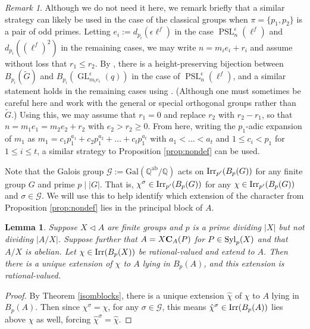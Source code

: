 \documentclass[12pt,leqno,a4paper]{amsart}
\newcommand{\Q}{{\mathbb{Q}}}
\newcommand{\PSL}{{\operatorname{PSL}}}
\def\syl#1#2{{\rm Syl}_#1(#2)}
\def\irr#1{{\rm Irr}(#1)}
\def\cent#1#2{{\bf C}_{#1}(#2)}
\def\irrp#1#2{{\rm Irr}_{#1'}(#2)}
\newtheorem{lem}[thm]{Lemma}
\theoremstyle{remark}
\newtheorem{rem}[thm]{Remark}
\newcommand\wt[1]{\widetilde{#1}}
\newcommand{\GL}{\operatorname{GL}}
\newcommand{\gal}{\mathcal{G}}
\begin{document}
\begin{rem}\label{rem:oddp1}
Although we do not need it here, we remark briefly that a similar strategy can likely be used in the case of the classical groups when $\pi=\{p_1,p_2\}$ is a pair of odd primes.  Letting $e_i:=d_{p_i}(\epsilon\ell^f)$ in the case $\PSL_n^\epsilon(\ell^f)$ and $d_{p_i}((\ell^f)^2)$ in the remaining cases, we may write $n=m_ie_i+r_i$ and assume without loss that $r_1\leq r_2$.
  By \cite[Theorem 1.9]{MO83}, there is a height-preserving bijection between $B_{p_i}(\wt{G})$ and $B_{p_i}(\GL^\epsilon_{m_ie_i}(q))$ in the case of $\PSL_n^\epsilon(\ell^f)$, and a similar statement holds in the remaining cases using \cite[Theorem 5.17]{malle19}. (Although one must sometimes be careful here and work with the general or special orthogonal groups rather than $\wt{G}$.) 
  Using this, we may assume that $r_1=0$ and replace $r_2$ with $r_2-r_1$, so that $n=m_1e_1=m_2e_2+r_2$ with $e_2>r_2\geq 0$.  
From here, writing the $p_1$-adic expansion of $m_1$ as $m_1=c_1p_1^{a_1}+c_2p_1^{a_2}+\ldots+c_tp_1^{a_t}$ with $a_1<\ldots<a_t$ and $1\leq c_i<p_1$ for $1\leq i\leq t$, a similar strategy to Proposition \ref{prop:nondef} can be used.  
\end{rem}



Note that the Galois group $\gal:=\mathrm{Gal}(\Q^{\mathrm{ab}}/\Q)$ acts on $\irrp{p}{B_p(G)}$ for any finite group $G$ and prime $p\mid|G|$. That is, $\chi^\sigma\in\irrp{p}{B_p(G)}$ for any $\chi\in\irrp{p}{B_p(G)}$ and $\sigma\in\gal$. We will use this to help identify which extension of the character from Proposition \ref{prop:nondef} lies in the principal block of $A$.

\begin{lem}\label{lem:rationalext}
Suppose $X\lhd A$ are finite groups and $p$ is a prime dividing $|X|$ but not dividing $|A/X|$.  Suppose further that $A=X\cent{A}{P}$ for $P\in \syl{p}{X}$ and that $A/X$ is abelian.  Let $\chi\in\irr{B_p(X)}$ be rational-valued and extend to $A$.  Then there is a unique extension of $\chi$ to $A$ lying in $B_p(A)$, and this extension is rational-valued.
\end{lem}



\begin{proof} 
By Theorem \ref{isomblocks}, there is a unique extension $\hat\chi$ of $\chi$ to $A$ lying in $B_p(A)$. Then since $\chi^\sigma=\chi$, for any $\sigma\in\gal$, this means $\hat\chi^\sigma\in\irr{B_p(A)}$  lies above $\chi$ as well, forcing $\hat\chi^\sigma=\hat\chi$.
\end{proof}
\end{document}
